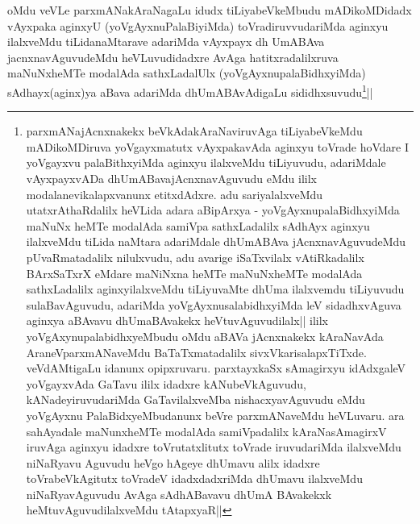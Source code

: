 \begin{artha}
oMdu veVLe parxmANakAraNagaLu idudx tiLiyabeVkeMbudu mADikoMDidadx vAyxpaka aginxyU (yoVgAyxnuPalaBiyiMda) toVradiruvvudariMda aginxyu ilalxveMdu tiLidanaMtarave adariMda vAyxpayx dh UmABAva jacnxnavAguvudeMdu heVLuvudidadxre AvAga hatitxradalilxruva maNuNxheMTe modalAda sathxLadalUlx (yoVgAyxnupalaBidhxyiMda) sAdhayx(aginx)ya aBava adariMda dhUmABAvAdigaLu sididhxsuvudu\footnote{parxmANajAcnxnakekx beVkAdakAraNaviruvAga tiLiyabeVkeMdu mADikoMDiruva yoVgayxmatutx vAyxpakavAda aginxyu toVrade hoVdare I yoVgayxvu palaBithxyiMda aginxyu ilalxveMdu tiLiyuvudu, adariMdale vAyxpayxvADa dhUmABavajAcnxnavAguvudu eMdu ililx modalanevikalapxvanunx etitxdAdxre. adu sariyalalxveMdu utatxrAthaRdalilx heVLida adara aBipArxya - yoVgAyxnupalaBidhxyiMda maNuNx heMTe modalAda samiVpa sathxLadalilx sAdhAyx aginxyu ilalxveMdu tiLida naMtara adariMdale dhUmABAva jAcnxnavAguvudeMdu pUvaRmatadalilx nilulxvudu, adu avarige iSaTxvilalx vAtiRkadalilx BArxSaTxrX eMdare maNiNxna heMTe maNuNxheMTe modalAda sathxLadalilx aginxyilalxveMdu tiLiyuvaMte dhUma ilalxvemdu tiLiyuvudu sulaBavAguvudu, adariMda yoVgAyxnusalabidhxyiMda leV sidadhxvAguva aginxya aBAvavu dhUmaBAvakekx heVtuvAguvudilalx||
ililx yoVgAxynupalabidhxyeMbudu oMdu aBAVa jAcnxnakekx kAraNavAda AraneVparxmANaveMdu BaTaTxmatadalilx sivxVkarisalapxTiTxde. veVdAMtigaLu idanunx opipxruvaru. parxtayxkaSx sAmagirxyu idAdxgaleV yoVgayxvAda GaTavu ililx idadxre kANubeVkAguvudu, kANadeyiruvudariMda GaTavilalxveMba nishacxyavAguvudu eMdu yoVgAyxnu PalaBidxyeMbudanunx beVre parxmANaveMdu heVLuvaru. ara sahAyadale maNunxheMTe modalAda samiVpadalilx kAraNasAmagirxV iruvAga aginxyu idadxre toVrutatxlitutx toVrade iruvudariMda ilalxveMdu niNaRyavu Aguvudu heVgo hAgeye dhUmavu alilx idadxre toVrabeVkAgitutx  toVradeV idadxdadxriMda dhUmavu  ilalxveMdu niNaRyavAguvudu AvAga sAdhABavavu dhUmA BAvakekxk heMtuvAguvudilalxveMdu tAtapxyaR||
}||
\end{artha}

